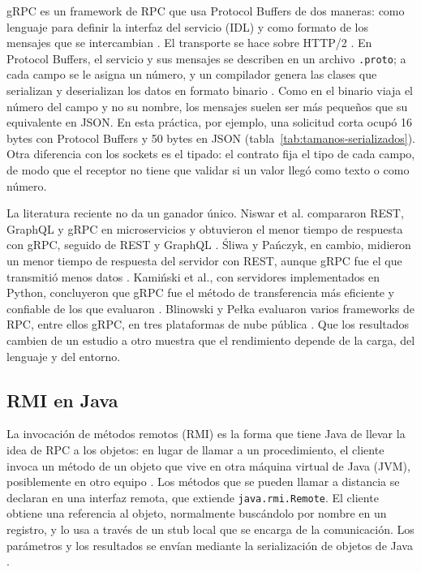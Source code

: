 gRPC es un framework de RPC que usa Protocol Buffers de dos maneras: como lenguaje para definir la interfaz del servicio (IDL) y como formato de los mensajes que se intercambian \cite{grpcIntro}. El transporte se hace sobre HTTP/2 \cite{niswar2024grpc}. En Protocol Buffers, el servicio y sus mensajes se describen en un archivo \texttt{.proto}; a cada campo se le asigna un número, y un compilador genera las clases que serializan y deserializan los datos en formato binario \cite{protobufProto3}. Como en el binario viaja el número del campo y no su nombre, los mensajes suelen ser más pequeños que su equivalente en JSON. En esta práctica, por ejemplo, una solicitud corta ocupó 16 bytes con Protocol Buffers y 50 bytes en JSON (tabla~\ref{tab:tamanos-serializados}). Otra diferencia con los sockets es el tipado: el contrato fija el tipo de cada campo, de modo que el receptor no tiene que validar si un valor llegó como texto o como número.

La literatura reciente no da un ganador único. Niswar et al. compararon REST, GraphQL y gRPC en microservicios y obtuvieron el menor tiempo de respuesta con gRPC, seguido de REST y GraphQL \cite{niswar2024grpc}. Śliwa y Pańczyk, en cambio, midieron un menor tiempo de respuesta del servidor con REST, aunque gRPC fue el que transmitió menos datos \cite{sliwa2021grpc}. Kamiński et al., con servidores implementados en Python, concluyeron que gRPC fue el método de transferencia más eficiente y confiable de los que evaluaron \cite{kaminski2023protocols}. Blinowski y Pełka evaluaron varios frameworks de RPC, entre ellos gRPC, en tres plataformas de nube pública \cite{blinowski2026rpc}. Que los resultados cambien de un estudio a otro muestra que el rendimiento depende de la carga, del lenguaje y del entorno.

\subsection{RMI en Java}

La invocación de métodos remotos (RMI) es la forma que tiene Java de llevar la idea de RPC a los objetos: en lugar de llamar a un procedimiento, el cliente invoca un método de un objeto que vive en otra máquina virtual de Java (JVM), posiblemente en otro equipo \cite{oracle2023rmi}. Los métodos que se pueden llamar a distancia se declaran en una interfaz remota, que extiende \texttt{java.rmi.Remote}. El cliente obtiene una referencia al objeto, normalmente buscándolo por nombre en un registro, y lo usa a través de un stub local que se encarga de la comunicación. Los parámetros y los resultados se envían mediante la serialización de objetos de Java \cite{oracle2023rmi}.

